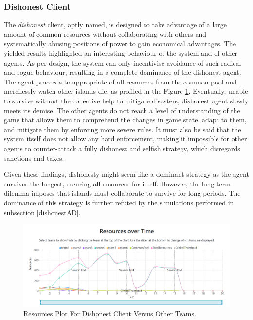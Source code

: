 \subsubsection{Dishonest Client}
The \emph{dishonest} client, aptly named, is designed to take advantage of a large amount of common resources without collaborating with others and systematically abusing positions of power to gain economical advantages. The yielded results highlighted an interesting behaviour of the system and of other agents. As per design, the system can only incentivise avoidance of such radical and rogue behaviour, resulting in a complete dominance of the dishonest agent. The agent proceeds to appropriate of all resources from the common pool and mercilessly watch other islands die, as profiled in the Figure \ref{fig:ResourcesDO}. Eventually, unable to survive without the collective help to mitigate disasters, dishonest agent slowly meets its demise. The other agents do not reach a level of understanding of the game that allows them to comprehend the changes in game state, adapt to them, and mitigate them by enforcing more severe rules. It must also be said that the system itself does not allow any hard enforcement, making it impossible for other agents to counter-attack a fully dishonest and selfish strategy, which disregards sanctions and taxes. 

Given these findings, dishonesty might seem like a dominant strategy as the agent survives the longest, securing all resources for itself. However, the long term dilemma imposes that islands must collaborate to survive for long periods. The dominance of this strategy is further refuted by the simulations performed in subsection \ref{dishonestAD}.

\begin{figure}[H]
\centering
\includegraphics[scale=0.4]{12_team4_agentdesign/images/ResourcesDO.png}
\caption{Resources Plot For Dishonest Client Versus Other Teams.}
\label{fig:ResourcesDO}
\end{figure}

